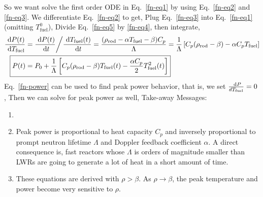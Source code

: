 \documentclass{school-22.211-notes}
\begin{document}
So we want solve the first order ODE in Eq.~\ref{fn-eq1} by using Eq.~\ref{fn-eq2} and \ref{fn-eq3}. We differentiate Eq.~\ref{fn-eq2} to get,
Plug Eq.~\ref{fn-eq3} into Eq.~\ref{fn-eq1} (omitting $T_{\mathrm{fuel}}^0$), 
Divide Eq.~\ref{fn-eq5} by \ref{fn-eq4}, then integrate, 
\begin{align}
\frac{\dP(t)}{\dT_{\mathrm{fuel}}} &= \frac{\dP(t)}{\dt} \bigg/  \frac{\dT_{\mathrm{fuel}} (t)}{\dt} =  \frac{(\rho_{\mathrm{rod}} - \alpha T_{\mathrm{fuel}} - \beta ) C_p}{\Lambda} 
= \frac{1}{\Lambda} \left[ C_p (\rho_{\mathrm{rod}} - \beta) - \alpha C_p T_{\mathrm{fuel}} \right] \\
\Aboxed{ P(t) &= P_0 + \frac{1}{\Lambda} \left[ C_p (\rho_{\mathrm{rod}} - \beta) T_{\mathrm{fuel}} (t)  - \frac{\alpha C_p}{2} T^2_{\mathrm{fuel}} (t) \right]  } \label{fn-power}
\end{align}
Eq.~\ref{fn-power} can be used to find peak power behavior, that is, we set $\frac{\mbox{ }\mathrm{d} P}{dT_{\mathrm{fuel}}} = 0$, 
Then we can solve for peak power as well, 
Take-away Messages: 
\begin{enumerate}
\item {} 
\item Peak power is proportional to heat capacity $C_p$ and inversely proportional to prompt neutron lifetime $\Lambda$ and Doppler feedback coefficient $\alpha$. A direct consequence is, fast reactors whose $\Lambda$ is orders of magnitude smaller than LWRs are going to generate a lot of heat in a short amount of time. 
\item These equations are derived with $\rho > \beta$. As $\rho \to \beta$, the peak temperature and power become very sensitive to $\rho$. 
\end{enumerate}
\end{document}
